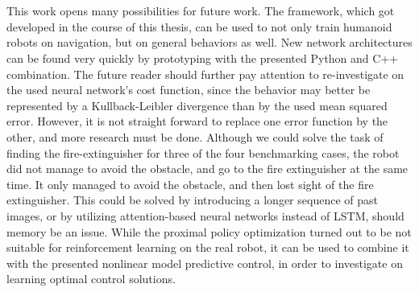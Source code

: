 \\\\
This work opens many possibilities for future work. The framework, which got developed in the course of this thesis, can be used to not only train humanoid robots on navigation, but on general behaviors as well. New network architectures can be found very quickly by prototyping with the presented Python and C++ combination. The future reader should further pay attention to re-investigate on the used neural network's cost function, since the behavior may better be represented by a Kullback-Leibler divergence than by the used mean squared error. However, it is not straight forward to replace one error function by the other, and more research must be done. Although we could solve the task of finding the fire-extinguisher for three of the four benchmarking cases, the robot did not manage to avoid the obstacle, and go to the fire extinguisher at the same time. It only managed to avoid the obstacle, and then lost sight of the fire extinguisher. This could be solved by introducing a longer sequence of past images, or by utilizing attention-based neural networks instead of LSTM, should memory be an issue. While the proximal policy optimization turned out to be not suitable for reinforcement learning on the real robot, it can be used to combine it with the presented nonlinear model predictive control, in order to investigate on learning optimal control solutions.